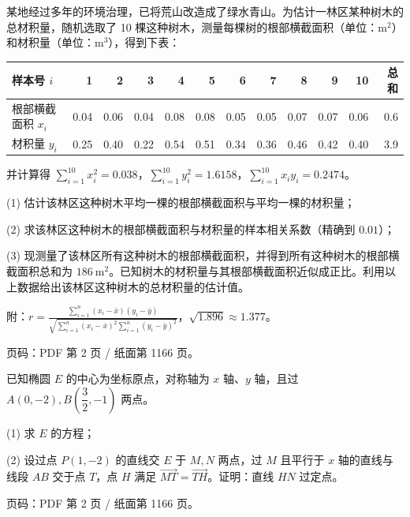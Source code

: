 \begin{question}
某地经过多年的环境治理，已将荒山改造成了绿水青山。为估计一林区某种树木的总材积量，随机选取了 10 棵这种树木，测量每棵树的根部横截面积（单位：$\mathrm m^2$）和材积量（单位：$\mathrm m^3$），得到下表：

\begin{center}
\begingroup\setlength{\tabcolsep}{4pt}
\begin{tabular}{lrrrrrrrrrrr}
\toprule
样本号 $i$ & 1 & 2 & 3 & 4 & 5 & 6 & 7 & 8 & 9 & 10 & 总和 \\
\midrule
根部横截面积 $x_i$ & 0.04 & 0.06 & 0.04 & 0.08 & 0.08 & 0.05 & 0.05 & 0.07 & 0.07 & 0.06 & 0.6 \\
材积量 $y_i$ & 0.25 & 0.40 & 0.22 & 0.54 & 0.51 & 0.34 & 0.36 & 0.46 & 0.42 & 0.40 & 3.9 \\
\bottomrule
\end{tabular}
\endgroup
\end{center}

并计算得 $\displaystyle\sum_{i=1}^{10}x_i^2=0.038$，$\displaystyle\sum_{i=1}^{10}y_i^2=1.6158$，$\displaystyle\sum_{i=1}^{10}x_iy_i=0.2474$。

  (1) 估计该林区这种树木平均一棵的根部横截面积与平均一棵的材积量；

  (2) 求该林区这种树木的根部横截面积与材积量的样本相关系数（精确到 $0.01$）；

  (3) 现测量了该林区所有这种树木的根部横截面积，并得到所有这种树木的根部横截面积总和为 $186\ \mathrm m^2$。已知树木的材积量与其根部横截面积近似成正比。利用以上数据给出该林区这种树木的总材积量的估计值。

附：$\displaystyle r=\frac{\sum_{i=1}^n(x_i-\bar x)(y_i-\bar y)}{\sqrt{\sum_{i=1}^n(x_i-\bar x)^2\sum_{i=1}^n(y_i-\bar y)^2}}$，$\sqrt{1.896}\approx1.377$。

\begin{gktip}
页码：PDF 第 2 页 / 纸面第 1166 页。
\end{gktip}

\end{question}
\begin{question}
已知椭圆 $E$ 的中心为坐标原点，对称轴为 $x$ 轴、$y$ 轴，且过 $A(0,-2),B\left(\dfrac32,-1\right)$ 两点。

  (1) 求 $E$ 的方程；

  (2) 设过点 $P(1,-2)$ 的直线交 $E$ 于 $M,N$ 两点，过 $M$ 且平行于 $x$ 轴的直线与线段 $AB$ 交于点 $T$，点 $H$ 满足 $\overrightarrow{MT}=\overrightarrow{TH}$。证明：直线 $HN$ 过定点。

\begin{gktip}
页码：PDF 第 2 页 / 纸面第 1166 页。
\end{gktip}

\end{question}
